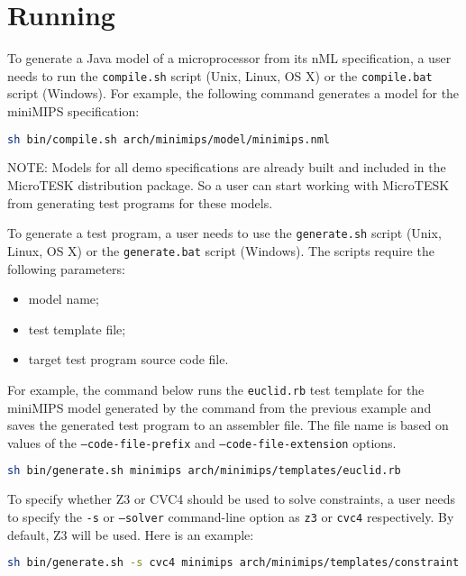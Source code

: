 \documentclass[oneside,final,12pt]{extreport}
\begin{document}
\section{Running}

To generate a Java model of a microprocessor from its nML specification, a user
needs to run the \texttt{compile.sh} script (Unix, Linux, OS X) or the \texttt{compile.bat}
script (Windows). For example, the following command generates a model for the miniMIPS
specification:

\begin{lstlisting}[language=bash]
sh bin/compile.sh arch/minimips/model/minimips.nml
\end{lstlisting}

NOTE: Models for all demo specifications are already built and included in the
MicroTESK distribution package. So a user can start working with MicroTESK from
generating test programs for these models.

To generate a test program, a user needs to use the \texttt{generate.sh} script
(Unix, Linux, OS X) or the \texttt{generate.bat} script (Windows). The scripts
require the following parameters:

\begin{itemize}
\item model name;
\item test template file;
\item target test program source code file.
\end{itemize}

For example, the command below runs the \texttt{euclid.rb} test template for
the miniMIPS model generated by the command from the previous example and saves
the generated test program to an assembler file. The file name is based on values
of the \texttt{--code-file-prefix} and \texttt{--code-file-extension} options.

\begin{lstlisting}[language=bash]
sh bin/generate.sh minimips arch/minimips/templates/euclid.rb
\end{lstlisting}

To specify whether Z3 or CVC4 should be used to solve constraints,
a user needs to specify the \texttt{-s} or \texttt{--solver} command-line option as \texttt{z3}
or \texttt{cvc4} respectively. By default, Z3 will be used. Here is an example:

\begin{lstlisting}[language=bash]
sh bin/generate.sh -s cvc4 minimips arch/minimips/templates/constraint.rb
\end{lstlisting}
\end{document}
